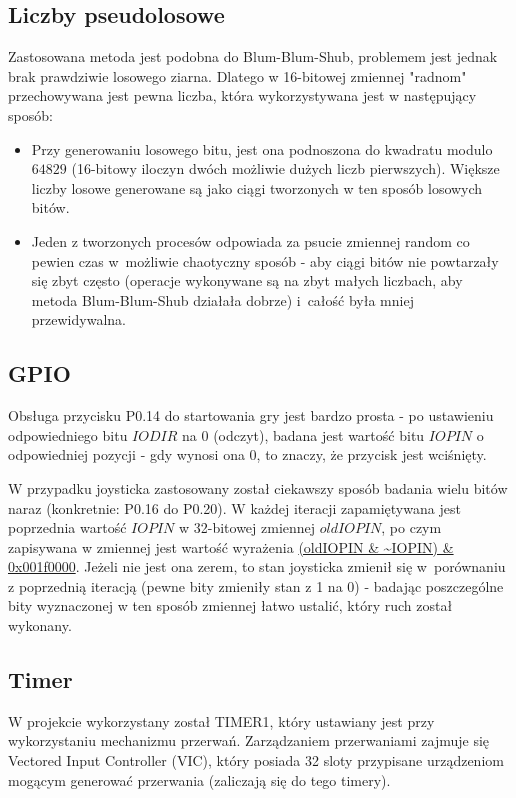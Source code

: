 \documentclass[a4paper, portrait,11pt]{article}
\begin{document}
\subsection{Liczby pseudolosowe}
Zastosowana metoda jest podobna do Blum-Blum-Shub, problemem
jest jednak brak prawdziwie losowego ziarna. Dlatego w 16-bitowej
zmiennej "radnom" przechowywana jest pewna liczba, która wykorzystywana
jest w następujący sposób:

\begin{itemize}
\item Przy generowaniu losowego bitu, jest ona podnoszona do kwadratu
modulo $64829$ (16-bitowy iloczyn dwóch możliwie dużych liczb pierwszych).
Większe liczby losowe generowane są jako ciągi tworzonych w ten sposób
losowych bitów.
\item Jeden z tworzonych procesów odpowiada za psucie zmiennej random co
pewien czas w~możliwie chaotyczny sposób - aby ciągi bitów nie powtarzały
się zbyt często (operacje wykonywane są na zbyt małych liczbach, aby
metoda Blum-Blum-Shub działała dobrze) i~całość była mniej przewidywalna.
\end{itemize}

\subsection{GPIO}
Obsługa przycisku P0.14 do startowania gry jest bardzo prosta
- po ustawieniu odpowiedniego bitu $IODIR$ na 0 (odczyt),
badana jest wartość bitu $IOPIN$ o odpowiedniej pozycji
- gdy wynosi ona $0$, to znaczy, że przycisk jest wciśnięty.

W przypadku joysticka zastosowany został ciekawszy sposób
badania wielu bitów naraz (konkretnie: P0.16 do P0.20).
W każdej iteracji zapamiętywana jest poprzednia wartość
$IOPIN$ w 32-bitowej zmiennej $oldIOPIN$, po czym zapisywana
w zmiennej jest wartość wyrażenia \url{(oldIOPIN & ~IOPIN) & 0x001f0000}.
Jeżeli nie jest ona zerem, to stan joysticka zmienił się w~porównaniu
z poprzednią iteracją (pewne bity zmieniły stan z 1 na 0) -
badając poszczególne bity wyznaczonej w ten sposób zmiennej łatwo
ustalić, który ruch został wykonany.

\subsection{Timer}
W projekcie wykorzystany został TIMER1, który ustawiany jest przy
wykorzystaniu mechanizmu przerwań. Zarządzaniem przerwaniami
zajmuje się Vectored Input Controller (VIC), który posiada
32 sloty przypisane urządzeniom mogącym generować przerwania
(zaliczają się do tego timery).
\end{document}
